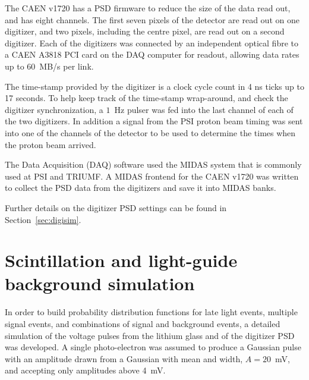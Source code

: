 \documentclass[letter,twocolumn,preprint,3p]{elsarticle}
\begin{document}
The CAEN v1720 has a PSD firmware to reduce the size of the data read
out, and has eight channels.  The first seven pixels of the detector
are read out on one digitizer, and two pixels, including the centre
pixel, are read out on a second digitizer.  Each of the digitizers was
connected by an independent optical fibre to a CAEN A3818 PCI card on
the DAQ computer for readout, allowing data rates up to 60~MB/s per
link.

The time-stamp provided by the digitizer is a clock cycle count in 4 ns
ticks up to 17 seconds.  To help keep track of the time-stamp
wrap-around, and check the digitizer synchronization, a $1$~Hz pulser
was fed into the last channel of each of the two digitizers.  In
addition a signal from the PSI proton beam timing was sent into one of
the channels of the detector to be used to determine the times when
the proton beam arrived.

The Data Acquisition (DAQ) software used the MIDAS system that is
commonly used at PSI and TRIUMF.  A MIDAS frontend for the CAEN v1720
was written to collect the PSD data from the digitizers and save it
into MIDAS banks. 

Further details on the digitizer PSD settings can be found in
Section~\ref{sec:digisim}.  


\section{ Scintillation and light-guide background simulation }\label{sec:sim}

In order to build probability distribution functions for late light
events, multiple signal events, and combinations of signal and
background events, a detailed simulation of the voltage pulses from
the lithium glass and of the digitizer PSD was developed.  A single
photo-electron was assumed to produce a Gaussian pulse with an
amplitude drawn from a Gaussian with mean and width, $A=20$~mV, and
accepting only amplitudes above 4~mV.
\end{document}

